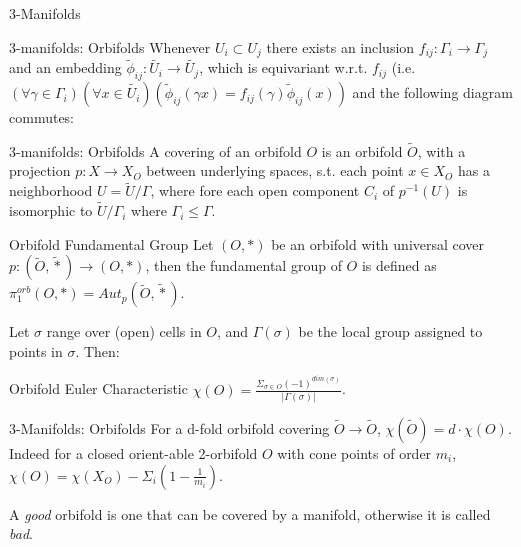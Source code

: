 \documentclass{beamer}
\begin{document}
\begin{section}{3-Manifolds}
\begin{frame}{3-manifolds: Orbifolds}
   Whenever $U_i\subset U_j$ there exists an inclusion $f_{ij}:\Gamma_i \rightarrow \Gamma_j$ and an embedding $\tilde{\phi}_{ij}: \tilde{U_i} \rightarrow \tilde{U_j}$, which is equivariant w.r.t. $f_{ij}$ (i.e. $(\forall \gamma \in \Gamma_i)(\forall x\in \tilde{U_i})(\tilde{\phi}_{ij}(\gamma x)= f_{ij}(\gamma)\tilde{\phi}_{ij}(x))$ and the following diagram commutes: 
    
\end{frame}

\begin{frame}{3-manifolds: Orbifolds}
    A covering of an orbifold $O$ is an orbifold $\tilde{O}$, with a projection $p: X \rightarrow X_O$ between underlying spaces, s.t. each point $x\in X_O$ has a neighborhood $U=\tilde{U}/\Gamma$, where fore each open component $C_i$ of $p^{-1}(U)$ is isomorphic to $\tilde{U}/\Gamma_i$ where $\Gamma_i\leq \Gamma$. 
    \begin{block}{Orbifold Fundamental Group}
        Let $(O,*)$ be an orbifold with universal cover $p:(\tilde{O},\tilde{*}) \rightarrow (O,*)$, then the fundamental group of $O$ is defined as $\pi_1^{orb}(O,*)=Aut_p(\tilde{O},\tilde{*})$.
    \end{block}{}
    Let $\sigma$ range over (open) cells in $O$, and $\Gamma(\sigma)$ be the local group assigned to points in $\sigma$. Then:
    \begin{block}{Orbifold Euler Characteristic}
        $\chi(O)=\frac{\Sigma_{\sigma \in O}(-1)^{dim(\sigma)}}{|\Gamma(\sigma)|}$.
    \end{block}{}
\end{frame}

\begin{frame}{3-Manifolds: Orbifolds}
    For a d-fold orbifold covering $\tilde{O}\rightarrow \tilde{O}$, $\chi(\tilde{O})=d \cdot \chi(O)$.
    \newline
    \newline
    Indeed for a closed orient-able 2-orbifold $O$ with cone points of order $m_i$, $\chi(O)=\chi(X_O)-\Sigma_i (1-\frac{1}{m_i})$. 
    
    A \textit{good} orbifold is one that can be covered by a manifold, otherwise it is called \textit{bad}. 


\end{frame}
\end{section}
\end{document}
